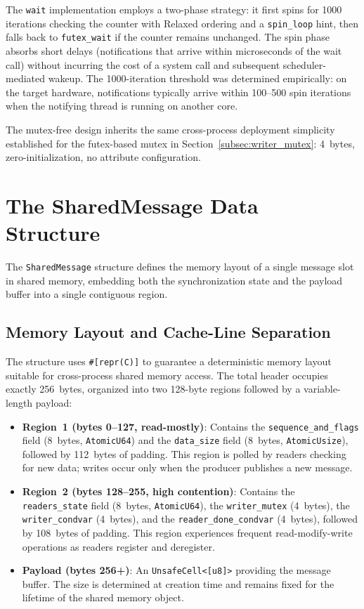 The \texttt{wait} implementation employs a two-phase strategy: it first spins for 1000 iterations checking the counter with Relaxed ordering and a \texttt{spin\_loop} hint, then falls back to \texttt{futex\_wait} if the counter remains unchanged. The spin phase absorbs short delays (notifications that arrive within microseconds of the wait call) without incurring the cost of a system call and subsequent scheduler-mediated wakeup. The 1000-iteration threshold was determined empirically: on the target hardware, notifications typically arrive within 100--500 spin iterations when the notifying thread is running on another core.

The mutex-free design inherits the same cross-process deployment simplicity established for the futex-based mutex in Section~\ref{subsec:writer_mutex}: 4~bytes, zero-initialization, no attribute configuration.


\section{The SharedMessage Data Structure}
\label{sec:shared_message}

The \texttt{SharedMessage} structure defines the memory layout of a single message slot in shared memory, embedding both the synchronization state and the payload buffer into a single contiguous region.

\subsection{Memory Layout and Cache-Line Separation}
\label{subsec:layout}

The structure uses \texttt{\#[repr(C)]} to guarantee a deterministic memory layout suitable for cross-process shared memory access. The total header occupies exactly 256~bytes, organized into two 128-byte regions followed by a variable-length payload:

\begin{itemize}
    \item \textbf{Region~1 (bytes 0--127, read-mostly)}: Contains the \texttt{sequence\_and\_flags} field (8~bytes, \texttt{AtomicU64}) and the \texttt{data\_size} field (8~bytes, \texttt{AtomicUsize}), followed by 112~bytes of padding. This region is polled by readers checking for new data; writes occur only when the producer publishes a new message.

    \item \textbf{Region~2 (bytes 128--255, high contention)}: Contains the \texttt{readers\_state} field (8~bytes, \texttt{AtomicU64}), the \texttt{writer\_mutex} (4~bytes), the \texttt{writer\_condvar} (4~bytes), and the \texttt{reader\_done\_condvar} (4~bytes), followed by 108~bytes of padding. This region experiences frequent read-modify-write operations as readers register and deregister.

    \item \textbf{Payload (bytes 256+)}: An \texttt{UnsafeCell<[u8]>} providing the message buffer. The size is determined at creation time and remains fixed for the lifetime of the shared memory object.
\end{itemize}

